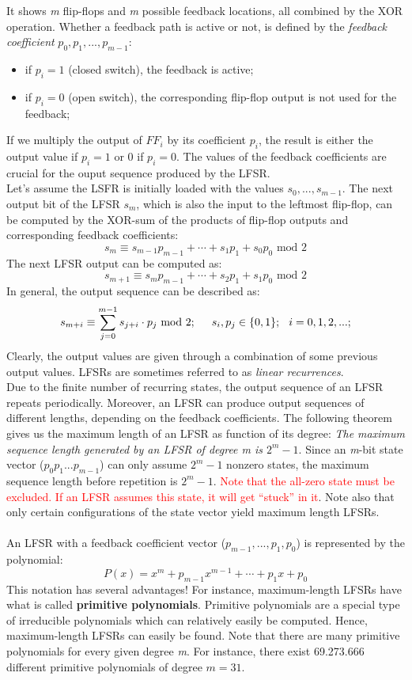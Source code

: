 \documentclass[11pt, a4paper]{article}
\newcommand{\doublequotes}[1]{“#1”}
\newcommand{\mymod}{
    \text{ mod }
}
\begin{document}
It shows \textit{m} flip-flops and \textit{m} possible feedback locations, all combined by the XOR operation. Whether a feedback path is active or not, is defined by the \textit{feedback coefficient} $p_0,p_1,...,p_{m-1}$:
\begin{itemize}
    \item if $p_i=1$ (closed switch), the feedback is active;
    \item if $p_i=0$ (open switch), the corresponding flip-flop output is not used for the feedback;
\end{itemize}
If we multiply the output of $FF_i$ by its coefficient $p_i$, the result is either the output value if $p_i=1$ or 0 if $p_i=0$. The values of the feedback coefficients are crucial for the ouput sequence produced by the LFSR.\\

Let's assume the LSFR is initially loaded with the values $s_0,...,s_{m-1}$. The next output bit of the LFSR $s_m$, which is also the input to the leftmost flip-flop, can be computed by the XOR-sum of the products of flip-flop outputs and corresponding feedback coefficients:
$$s_m\equiv s_{m-1}p_{m-1}+\cdots+s_1p_1+s_0p_0\mymod 2$$
The next LFSR output can be computed as:
$$s_{m+1}\equiv s_mp_{m-1}+\cdots+s_2p_1+s_1p_0\mymod 2$$
In general, the output sequence can be described as:
$$s_{m+i}\equiv\displaystyle\sum_{j=0}^{m-1}s_{j+i}\cdot p_j\mymod 2;\hspace{0.5cm}s_i,p_j\in\{0,1\};\hspace{0.25cm}i=0,1,2,...;$$
Clearly, the output values are given through a combination of some previous output values. LFSRs are sometimes referred to as \textit{linear recurrences}.\\

Due to the finite number of recurring states, the output sequence of an LFSR repeats periodically. Moreover, an LFSR can produce output sequences of different lengths, depending on the feedback coefficients. The following theorem gives us the maximum length of an LFSR as function of its degree:
\textit{The maximum sequence length generated by an LFSR of degree \textit{m} is $2^m-1$}. Since an \textit{m}-bit state vector ($p_0p_1...p_{m-1}$) can only assume $2^m-1$ nonzero states, the maximum sequence length before repetition is $2^m-1$. \textcolor{red}{Note that the all-zero state must be excluded. If an LFSR assumes this state, it will get \doublequotes{stuck} in it}. Note also that only certain configurations of the state vector yield maximum length LFSRs.\\\\
An LFSR with a feedback coefficient vector ($p_{m-1},...,p_1,p_0$) is represented by the polynomial:
$$P(x)=x^m+p_{m-1}x^{m-1}+\cdots+p_1x+p_0$$
This notation has several advantages! For instance, maximum-length LFSRs have what is called \textbf{primitive polynomials}. Primitive polynomials are a special type of irreducible polynomials which can relatively easily be computed. Hence, maximum-length LFSRs can easily be found. Note that there are many primitive polynomials for every given degree \textit{m}. For instance, there exist 69.273.666 different primitive polynomials of degree $m=31$.
\end{document}
